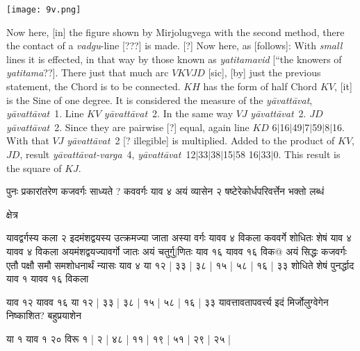 \documentclass[12pt]{book}
\def\ya{\textit{y\=avat\-t\=avat}}
\def\yava{\textit{y\=avat\-t\=avat-varga}}
\def\danda{$|$}
\begin{document}
\begin{center}
\texttt{[image: 9v.png]}
\end{center}

\newpage

Now here, [in] the figure shown by Mirjolugvega with the second method, there 
the contact of a \textit{vadgu}-line [???] is made. [?]  Now here, as [follows]:  
With \emph{small} lines 
it is effected, in that way by those known as \textit{yatitamavid} [``the knowers of
\textit{yatitama}??].  There just that much arc $VKVJD$ [sic], [by] just the previous
statement, the Chord is to be connected. $KH$ has the form of half Chord $KV$, 
[it] is the Sine of one degree. It is considered the measure of the \ya, \ya\ 1.
Line $KV$ \ya\ 2. In the same way $VJ$ \ya\ 2. $JD$ \ya\ 2. Since they are 
pairwise [?] equal, again line $KD$
6\danda 16\danda 49\danda 7\danda 59\danda 8\danda 16. 
With that $VJ$ \ya\ 2 [? illegible] is multiplied. Added to the product of
$KV$, $JD$, result \yava\ 4, \ya\ 12\danda 33\danda 38\danda 15\danda 58
16\danda 33\danda 0. This result is the square of $KJ$. \\

\iffalse 
\begin{center}
\texttt{[image: 9v.png]}
\captionof{figure}{9v}
\end{center}
\fi 

\newpage

{\s पुनः प्रकारांतरेण कजवर्गः साध्यते ? कववर्गः याव ४
अयं व्यासेन २ षष्टेरेकोर्धपरिवर्त्तेन भक्तो लब्धं

क्षेत्र

यावद्वर्गस्य कला २ इदमंशद्वयस्य उत्क्रमज्या जाता अस्या वर्गः यावव ४
विकला कववर्गे शोधितः शेषं याव ४ यावव ४ विकला अयमंशद्वयज्यावर्गो
जातः अयं चतुर्गु$|$णितः
 याव १६ यावव १६ विक@ अयं
सिद्धः कजवर्गः एतौ पक्षौ समौ समशोधनार्थं न्यासः याव ४ या १२ |
३३ | ३८ | १५ | ५८ | १६ | ३३ शोधिते शेषं पुनर्द्धाद 
याव १ यावव १६ विकला

याव १२
यावव १६ या १२ | ३३ | ३८ | १५ | ५८ | १६ | ३३ यावत्तावतापवर्त्त्य इदं मिर्जोलुग्वेगेन निष्काशित? बहुप्रयाशेन

या १ याव १ २० विरू १ | २ | ४८ | ११ | १९ | ५१ | २९ | २५ |} 

\newpage
\end{document}
